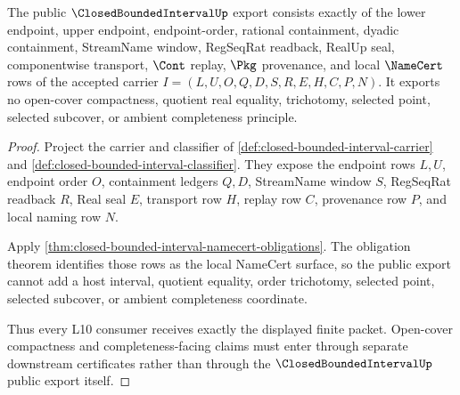 \begin{theorem}
\label{thm:closed-bounded-interval-public-export}
The public $\ClosedBoundedIntervalUp$ export consists exactly of the lower endpoint, upper endpoint, endpoint-order, rational containment, dyadic containment, StreamName window, RegSeqRat readback, RealUp seal, componentwise transport, $\Cont$ replay, $\Pkg$ provenance, and local $\NameCert$ rows of the accepted carrier $I=(L,U,O,Q,D,S,R,E,H,C,P,N)$. It exports no open-cover compactness, quotient real equality, trichotomy, selected point, selected subcover, or ambient completeness principle.
\end{theorem}
\begin{proof}
Project the carrier and classifier of \autoref{def:closed-bounded-interval-carrier} and \autoref{def:closed-bounded-interval-classifier}. They expose the endpoint rows $L,U$, endpoint order $O$, containment ledgers $Q,D$, StreamName window $S$, RegSeqRat readback $R$, Real seal $E$, transport row $H$, replay row $C$, provenance row $P$, and local naming row $N$.

Apply \autoref{thm:closed-bounded-interval-namecert-obligations}. The obligation theorem identifies those rows as the local NameCert surface, so the public export cannot add a host interval, quotient equality, order trichotomy, selected point, selected subcover, or ambient completeness coordinate.

Thus every L10 consumer receives exactly the displayed finite packet. Open-cover compactness and completeness-facing claims must enter through separate downstream certificates rather than through the $\ClosedBoundedIntervalUp$ public export itself.
\end{proof}

